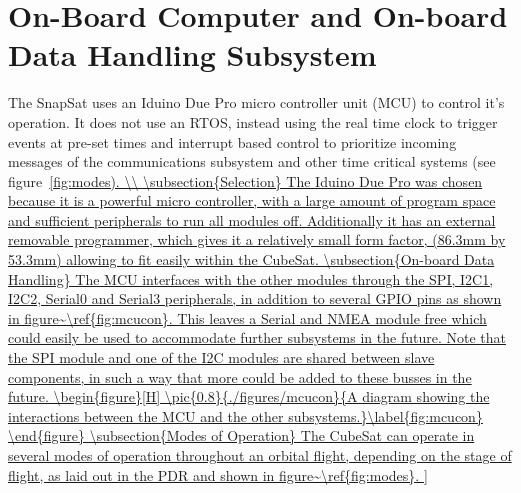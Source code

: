 \section{On-Board Computer and On-board Data Handling Subsystem}

The SnapSat uses an Iduino Due Pro micro controller unit (MCU) to control it's operation.  It does not use an RTOS, instead using the real time clock to trigger events at pre-set times and interrupt based control to prioritize incoming messages of the communications subsystem and other time critical systems (see figure~\ref{fig:modes). \\

\subsection{Selection}

The Iduino Due Pro was chosen because it is a powerful micro controller, with a large amount of program space and sufficient peripherals to run all modules off.  Additionally it has an external removable programmer, which gives it a relatively small form factor, (86.3mm by 53.3mm) allowing to fit easily within the CubeSat.

\subsection{On-board Data Handling}

The MCU interfaces with the other modules through the SPI, I2C1, I2C2, Serial0 and Serial3 peripherals, in addition to several GPIO pins as shown in figure~\ref{fig:mcucon}.  This leaves a Serial and NMEA module free which could easily be used to accommodate further subsystems in the future.  Note that the SPI module and one of the I2C modules are shared between slave components, in such a way that more could be added to these busses in the future.

\begin{figure}[H]
	\pic{0.8}{./figures/mcucon}{A diagram showing the interactions between the MCU and the other subsystems.}\label{fig:mcucon}
\end{figure}

\subsection{Modes of Operation}

The CubeSat can operate in several modes of operation throughout an orbital flight, depending on the stage of flight, as laid out in the PDR and shown in figure~\ref{fig:modes}.

}
